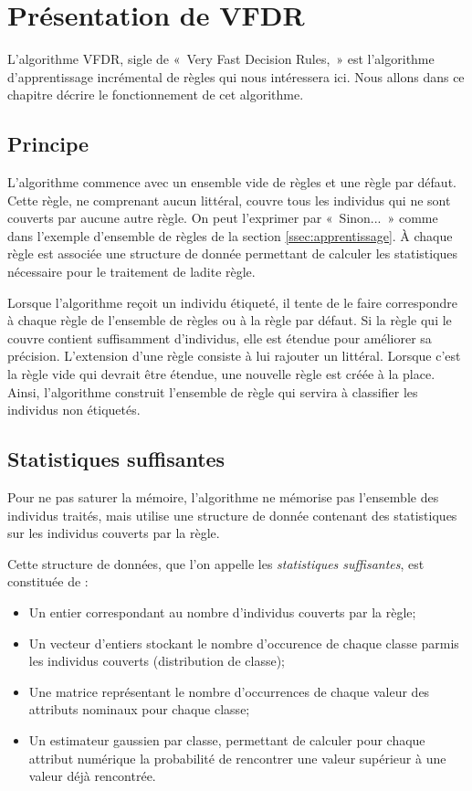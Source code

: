 \section{Présentation de VFDR}

        L’algorithme VFDR, sigle de «~Very Fast Decision Rules,~» est l’algorithme d’apprentissage incrémental de règles qui nous intéressera ici. Nous allons dans ce chapitre décrire le fonctionnement de cet algorithme.

        \subsection{Principe}

            L’algorithme commence avec un ensemble vide de règles et une règle par défaut. Cette règle, ne comprenant aucun littéral, couvre tous les individus qui ne sont couverts par aucune autre règle. On peut l'exprimer par «~Sinon...~» comme dans l'exemple d’ensemble de règles de la section \ref{ssec:apprentissage}. À chaque règle est associée une structure de donnée permettant de calculer les statistiques nécessaire pour le traitement de ladite règle.

            Lorsque l’algorithme reçoit un individu étiqueté, il tente de le faire correspondre à chaque règle de l’ensemble de règles ou à la règle par défaut. Si la règle qui le couvre contient suffisamment d’individus, elle est étendue pour améliorer sa précision. L’extension d’une règle consiste à lui rajouter un littéral. Lorsque c’est la règle vide qui devrait être étendue, une nouvelle règle est créée à la place. Ainsi, l’algorithme construit l’ensemble de règle qui servira à classifier les individus non étiquetés.

        \subsection{Statistiques suffisantes}\label{ssec:stats}

            Pour ne pas saturer la mémoire, l’algorithme ne mémorise pas l’ensemble des individus traités, mais utilise une structure de donnée contenant des statistiques sur les individus couverts par la règle.

            Cette structure de données, que l’on appelle les \emph{statistiques suffisantes}, est constituée de :
            \begin{itemize}
                \item Un entier correspondant au nombre d’individus couverts par la règle;
                \item Un vecteur d’entiers stockant le nombre d’occurence de chaque classe parmis les individus couverts (distribution de classe);
                \item Une matrice représentant le nombre d'occurrences de chaque valeur des attributs nominaux pour chaque classe;
                \item Un estimateur gaussien par classe, permettant de calculer pour chaque attribut numérique la probabilité de rencontrer une valeur supérieur à une valeur déjà rencontrée.
            \end{itemize}

